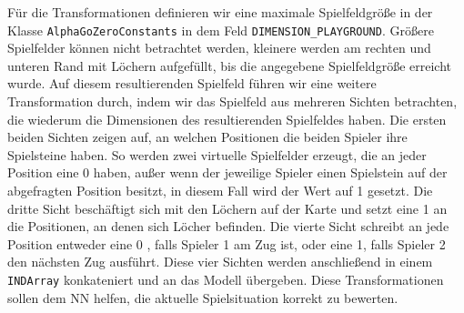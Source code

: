 \documentclass[12pt,a4paper]{article}
\begin{document}

Für die Transformationen definieren wir eine maximale Spielfeldgröße in der Klasse \texttt{AlphaGoZeroConstants} in dem Feld \texttt{DIMENSION\_PLAYGROUND}. Größere Spielfelder können nicht betrachtet werden, kleinere werden am rechten und unteren Rand mit Löchern aufgefüllt, bis die angegebene Spielfeldgröße erreicht wurde.
Auf diesem resultierenden Spielfeld führen wir eine weitere Transformation durch, indem wir das Spielfeld aus mehreren Sichten betrachten, die wiederum die Dimensionen des resultierenden Spielfeldes haben. Die ersten beiden Sichten zeigen auf, an welchen Positionen die beiden Spieler ihre Spielsteine haben. So werden zwei virtuelle Spielfelder erzeugt, die an jeder Position eine 0 haben, außer wenn der jeweilige Spieler einen Spielstein auf der abgefragten Position besitzt, in diesem Fall wird der Wert auf \glqq{}1\grqq{} gesetzt. Die dritte Sicht beschäftigt sich mit den Löchern auf der Karte und setzt eine \glqq{}1\grqq{}  an die Positionen, an denen sich Löcher befinden. Die vierte Sicht schreibt an jede Position entweder eine \glqq{}0\grqq{} , falls Spieler 1 am Zug ist, oder eine \glqq{}1\grqq{}, falls Spieler 2 den nächsten Zug ausführt. Diese vier Sichten werden anschließend in einem \texttt{INDArray} konkateniert und an das Modell übergeben. Diese Transformationen sollen dem NN helfen, die aktuelle Spielsituation korrekt zu bewerten. \bigskip
\end{document}
